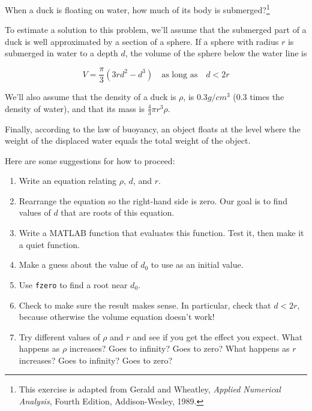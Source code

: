 \begin{ex}
\label{duck}

When a duck is floating on water, how much of its body is submerged?\footnote{This exercise is adapted from Gerald and Wheatley, {\em Applied Numerical Analysis}, Fourth Edition, Addison-Wesley, 1989.}


To estimate a solution to this problem, we'll assume that the submerged part of a duck is well approximated by a section of a sphere.
If a sphere with radius $r$ is submerged in water to a depth $d$, the
volume of the sphere below the water line is

\[ V = \frac{\pi}{3} (3r d^2 - d^3) \quad
\mbox{as long as} \quad d < 2 r  \]

We'll also assume that the density of a duck is $\rho$, is $0.3 g / cm^3$ (0.3 times the density of water), and that its mass is $\frac{4}{3} \pi r^3 \rho$.

Finally, according to the law of buoyancy, an object floats at the level where the weight of the displaced water equals the total weight of the object.


Here are some suggestions for how to proceed:

\begin{enumerate}

\item Write an equation relating $\rho$, $d$, and $r$.

\item Rearrange the equation so the right-hand side is zero.
Our goal is to find values of $d$ that are roots of this equation.

\item Write a MATLAB function that evaluates this function.  Test it,
   then make it a quiet function.

\item Make a guess about the value of $d_0$ to use as an initial value.

\item Use {\tt fzero} to find a root near $d_0$.

\item Check to make sure the result makes sense.  In particular,
   check that $d < 2 r$, because otherwise the volume equation
   doesn't work!

\item Try different values of $\rho$ and $r$ and see if you get the
  effect you expect.  What happens as $\rho$ increases?  Goes to
  infinity?  Goes to zero?  What happens as $r$ increases?  Goes to
  infinity?  Goes to zero?

\end{enumerate}

\end{ex}

